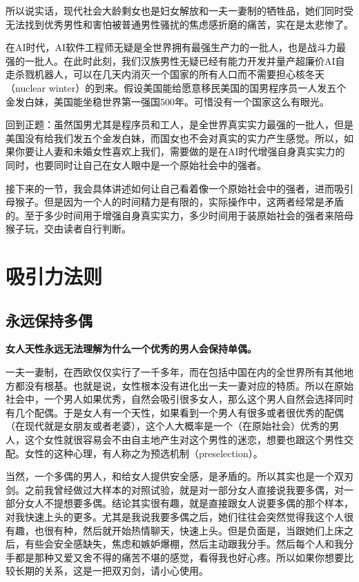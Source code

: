 所以说实话，现代社会大龄剩女也是妇女解放和一夫一妻制的牺牲品，她们同时受无法找到优秀男性和害怕被普通男性骚扰的焦虑感折磨的痛苦，实在是太悲惨了。

在AI时代，AI软件工程师无疑是全世界拥有最强生产力的一批人，也是战斗力最强的一批人。在此时此刻，我们汉族男性无疑已经有能力开发并量产超廉价AI自走杀戮机器人，可以在几天内消灭一个国家的所有人口而不需要担心核冬天（nuclear winter）的到来。假设美国能给愿意移民美国的国男程序员一人发五个金发白妹，美国能坐稳世界第一强国500年。可惜没有一个国家这么有眼光。

回到正题：虽然国男尤其是程序员和工人，是全世界真实实力最强的一批人，但是美国没有给我们发五个金发白妹，而国女也不会对真实的实力产生感觉。所以，如果你要让人妻和未婚女性喜欢上我们，需要做的是在AI时代增强自身真实实力的同时，也要同时让自己在女人眼中是一个原始社会中的强者。

接下来的一节，我会具体讲述如何让自己看着像一个原始社会中的强者，进而吸引母猴子。但是因为一个人的时间精力是有限的，实际操作中，这两者经常是矛盾的。至于多少时间用于增强自身真实实力，多少时间用于装原始社会的强者来陪母猴子玩，交由读者自行判断。

\section{吸引力法则}

\subsection{永远保持多偶}

\textbf{女人天性永远无法理解为什么一个优秀的男人会保持单偶。}

一夫一妻制，在西欧仅仅实行了一千多年，而在包括中国在内的全世界所有其他地方都没有根基。也就是说，女性根本没有进化出一夫一妻对应的特质。所以在原始社会中，一个男人如果优秀，自然会吸引很多女人，那么这个男人自然会选择同时有几个配偶。于是女人有一个天性，如果看到一个男人有很多或者很优秀的配偶（在现代就是女朋友或者老婆），这个人大概率是一个（在原始社会）优秀的男人，这个女性就很容易会不由自主地产生对这个男性的迷恋，想要也跟这个男性交配。女性的这种心理，有人称之为预选机制（preselection）。

当然，一个多偶的男人，和给女人提供安全感，是矛盾的。所以其实也是一个双刃剑。之前我曾经做过大样本的对照试验，就是对一部分女人直接说我要多偶，对一部分女人不提想要多偶。结论其实很有趣，就是直接跟女人说要多偶的那个样本，对我快速上头的更多。尤其是我说我要多偶之后，她们往往会突然觉得我这个人很有趣，也很有种，然后就开始热情聊天，快速上头。但是负面是，当跟她们上床之后，有些会安全感缺失，焦虑和嫉妒爆棚，然后主动跟我分手。然后每个人和我分手都是那种又爱又舍不得的痛苦不堪的感觉，看得我也好心疼。所以如果你想要比较长期的关系，这是一把双刃剑，请小心使用。

